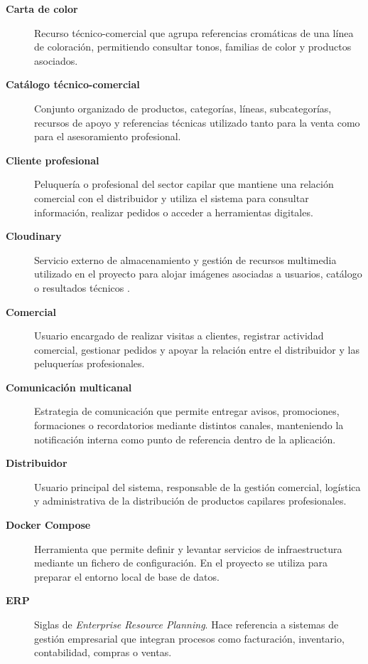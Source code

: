 \begin{description}
\item[\textbf{Carta de color}]
Recurso técnico-comercial que agrupa referencias cromáticas de una línea de coloración, permitiendo consultar tonos, familias de color y productos asociados.

\item[\textbf{Catálogo técnico-comercial}]
Conjunto organizado de productos, categorías, líneas, subcategorías, recursos de apoyo y referencias técnicas utilizado tanto para la venta como para el asesoramiento profesional.

\item[\textbf{Cliente profesional}]
Peluquería o profesional del sector capilar que mantiene una relación comercial con el distribuidor y utiliza el sistema para consultar información, realizar pedidos o acceder a herramientas digitales.

\item[\textbf{Cloudinary}]
Servicio externo de almacenamiento y gestión de recursos multimedia utilizado en el proyecto para alojar imágenes asociadas a usuarios, catálogo o resultados técnicos \citep{cloudinaryupload2026}.

\item[\textbf{Comercial}]
Usuario encargado de realizar visitas a clientes, registrar actividad comercial, gestionar pedidos y apoyar la relación entre el distribuidor y las peluquerías profesionales.

\item[\textbf{Comunicación multicanal}]
Estrategia de comunicación que permite entregar avisos, promociones, formaciones o recordatorios mediante distintos canales, manteniendo la notificación interna como punto de referencia dentro de la aplicación.

\item[\textbf{Distribuidor}]
Usuario principal del sistema, responsable de la gestión comercial, logística y administrativa de la distribución de productos capilares profesionales.

\item[\textbf{Docker Compose}]
Herramienta que permite definir y levantar servicios de infraestructura mediante un fichero de configuración. En el proyecto se utiliza para preparar el entorno local de base de datos.

\item[\textbf{ERP}]
Siglas de \textit{Enterprise Resource Planning}. Hace referencia a sistemas de gestión empresarial que integran procesos como facturación, inventario, contabilidad, compras o ventas.


\end{description}

